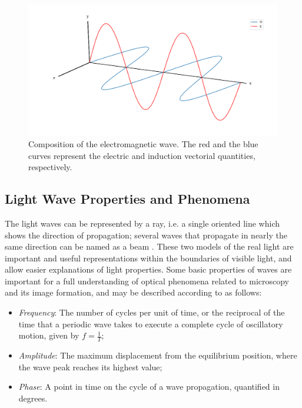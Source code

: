\begin{figure}[htb]
	\centering
	\caption{\label{fig:electromagnetic_wave} 
		Composition of the electromagnetic wave. The red and the blue curves represent the electric and induction vectorial quantities, respectively.}
	\begin{center}
	    \includegraphics[scale=0.3]
			{images/fig2.png}
	\end{center}
	\centering
	\fautor
\end{figure}

\subsection{Light Wave Properties and Phenomena}

The light waves can be represented by a ray, i.e. a single oriented line which shows the direction of propagation; several waves that propagate in nearly the same direction can be named as a beam \cite{halliday2013fundamentals}. These two models of the real light are important and useful representations within the boundaries of visible light, and allow easier explanations of light properties. Some basic properties of waves are important for a full understanding of optical phenomena related to microscopy and its image formation, and may be described according to  as follows:

\begin{itemize}
    \item \emph{Frequency}: The number of cycles per unit of time, or the reciprocal of the time that a periodic wave takes to execute a complete cycle of oscillatory motion, given by $f = \frac{1}{T}$;
    
    \item \emph{Amplitude}: The maximum displacement from the equilibrium position, where the wave peak reaches its highest value;
    
    \item \emph{Phase}: A point in time on the cycle of a wave propagation, quantified in degrees.
\end{itemize}

